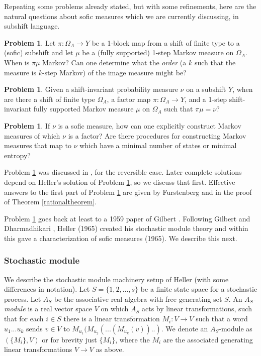 \documentclass{kepart2010}
\theoremstyle{plain}
\theoremstyle{definition}
\newtheorem{prob}[thm]{Problem}
\theoremstyle{remark}
\theoremstyle{definition}
\numberwithin{equation}{section}
\begin{document}
Repeating some problems already stated, but with some refinements,
here are the natural questions about sofic measures which we are
currently discussing, in subshift language.

\begin{prob}\label{prob_1}
Let $\pi: \Omega_A \to Y$ be a 1-block map from a shift of finite
type to a (sofic) subshift and let $\mu$ be a (fully supported)
1-step Markov measure on $\Omega_A$. When is $\pi\mu$ Markov? Can
one determine what the {\em order} (a $k$ such that the measure is
$k$-step Markov) of the image measure might be?
\end{prob}

\begin{prob}\label{prob_2}
Given a shift-invariant probability measure $\nu$ on a subshift $Y$,
when are there a shift of finite type $\Omega_A$, a factor map $\pi:
\Omega_A \to Y$, and a 1-step shift-invariant fully supported Markov
measure $\mu$ on $\Omega_A$ such that $\pi\mu=\nu$?
\end{prob}

\begin{prob}\label{prob_3}
If $\nu$ is a sofic measure, how can one explicitly construct Markov
measures of which $\nu$ is a factor? Are there procedures for
constructing Markov measures that map to $\nu$ which have a minimal
number of states or minimal entropy?
\end{prob}

Problem \ref{prob_1} was discussed in \cite{BurkeRosenblatt1958},
for the reversible case. Later complete solutions depend on Heller's
solution of Problem \ref{prob_2}, so we discuss that first.
Effective answers to the first part of Problem \ref{prob_3} are
given by Furstenberg and in the proof of Theorem
\ref{rationaltheorem}.

{ Problem \ref{prob_2} goes back at least to a 1959 paper of Gilbert
\cite{Gilbert1959}. Following Gilbert and Dharmadhikari
\cite{Dharma1963,Dharma1963-2,Dharma1964,Dharma1965}, Heller (1965)
created his stochastic module theory and within this gave a
characterization
 \cite{Heller1965,Heller1967}
of sofic measures (1965). We describe this next. }

\subsubsection{Stochastic module}\label{subsubsec_stochmod}

We describe the stochastic module machinery setup of Heller
\cite{Heller1965} (with some differences in notation).
Let $S=\{1,2,...,s\}$ be a finite state space for a stochastic
process. Let $A_S$ be the associative real algebra with free
generating set $S$.
An {\em $A_S$-module} is a real vector space $V$ on
which $A_S$ acts by linear transformations, such that for each $i
\in S$ there is a linear transformation $M_i:V\to V$ such that a
word $u_1...u_k$ sends $v \in V$ to
$M_{u_1}(M_{u_2}(...(M_{u_k}(v))..)$. We denote an $A_S$-module as
 $(\{M_i\},V)$ or for brevity just $\{M_i\}$,
where the $M_i$ are the associated generating
linear transformations $V \to V$ as above.
\end{document}
